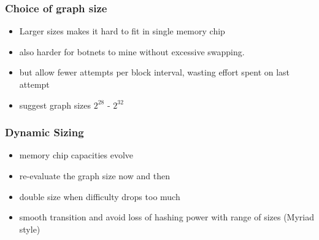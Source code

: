\documentclass{beamer}
\begin{document}
\begin{frame}
\frametitle{Choice of graph size}
\begin{itemize}
\item Larger sizes makes it hard to fit in single memory chip
\item also harder for botnets to mine without excessive swapping.
\item but allow fewer attempts per block interval, wasting effort spent on last attempt
\item suggest graph sizes $2^{28}$ - $2^{32}$
\end{itemize}
\end{frame}

\begin{frame}
\frametitle{Dynamic Sizing}
\begin{itemize}
\item memory chip capacities evolve
\item
re-evaluate the graph size now and then
\item
double size when difficulty drops too much
\item smooth transition and avoid loss of hashing power
  with range of sizes (Myriad style)


\end{itemize}
\end{frame}
\end{document}
